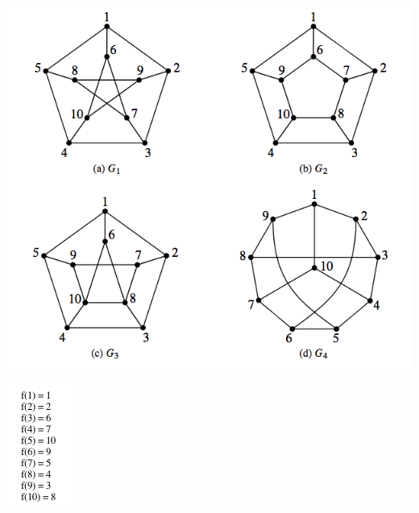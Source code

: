 \documentclass[12pt]{article}
\begin{document}
\begin{enumerate}
\begin{center}
\includegraphics[scale=0.35]{all.png}
\end{center}


\includegraphics[scale=1.39]{q.png}



\end{enumerate}
\end{document}
